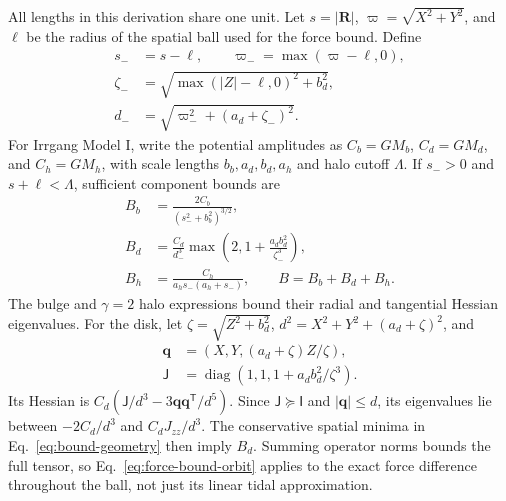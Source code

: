 \documentclass[aps,prd,reprint,amsmath,amssymb,superscriptaddress,nofootinbib,longbibliography,floatfix]{revtex4-2}
\begin{document}
All lengths in this derivation share one unit. Let $s=|\mathbf R|$, $\varpi=\sqrt{X^2+Y^2}$, and $\ell$ be the radius of the spatial ball used for the force bound. Define
\begin{align}
s_-&=s-\ell,\qquad \varpi_-=\max(\varpi-\ell,0),\nonumber\\
\zeta_-&=\sqrt{\max(|Z|-\ell,0)^2+b_d^2},\nonumber\\
d_-&=\sqrt{\varpi_-^2+(a_d+\zeta_-)^2}.
\label{eq:bound-geometry}
\end{align}
For Irrgang Model I, write the potential amplitudes as $C_b=GM_b$, $C_d=GM_d$, and $C_h=GM_h$, with scale lengths $b_b,a_d,b_d,a_h$ and halo cutoff $\Lambda$. If $s_->0$ and $s+\ell<\Lambda$, sufficient component bounds are
\begin{align}
B_b&=\frac{2C_b}{(s_-^2+b_b^2)^{3/2}},\nonumber\\
B_d&=\frac{C_d}{d_-^3}
\max\left(2,1+\frac{a_d b_d^2}{\zeta_-^3}\right),\nonumber\\
B_h&=\frac{C_h}{a_h s_-(a_h+s_-)},\qquad B=B_b+B_d+B_h.
\label{eq:component-force-bounds}
\end{align}
The bulge and $\gamma=2$ halo expressions bound their radial and tangential Hessian eigenvalues. For the disk, let $\zeta=\sqrt{Z^2+b_d^2}$, $d^2=X^2+Y^2+(a_d+\zeta)^2$, and
\begin{align}
\mathbf q&=(X,Y,(a_d+\zeta)Z/\zeta),\nonumber\\
\mathsf J&=\operatorname{diag}(1,1,1+a_d b_d^2/\zeta^3).
\end{align}
Its Hessian is $C_d(\mathsf J/d^3-3\mathbf q\mathbf q^{\mathsf T}/d^5)$. Since $\mathsf J\succeq\mathsf I$ and $|\mathbf q|\le d$, its eigenvalues lie between $-2C_d/d^3$ and $C_dJ_{zz}/d^3$. The conservative spatial minima in Eq.~\eqref{eq:bound-geometry} then imply $B_d$. Summing operator norms bounds the full tensor, so Eq.~\eqref{eq:force-bound-orbit} applies to the exact force difference throughout the ball, not just its linear tidal approximation.


\end{document}

